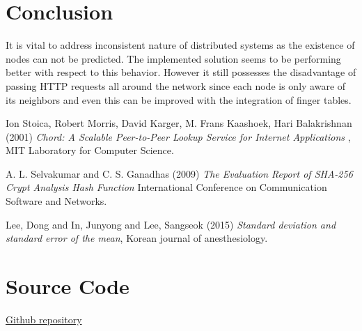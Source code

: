 \documentclass[
    a4paper,
    twocolumn,
]{article}
\begin{document}
\section{Conclusion}

It is vital to address inconsistent nature of distributed systems as the existence of nodes can not be predicted. The implemented solution seems to be performing better with respect to this behavior. However it still possesses the disadvantage of passing HTTP requests all around the network since each node is only aware of its neighbors and even this can be improved with the integration of finger tables. 

\begin{thebibliography}{9}	
	Ion Stoica, Robert Morris, David Karger, M. Frans Kaashoek, Hari Balakrishnan (2001) \emph{Chord: A Scalable Peer-to-Peer Lookup Service for Internet Applications }, MIT Laboratory for Computer Science.
	
	A. L. Selvakumar and C. S. Ganadhas (2009) \emph{The Evaluation Report of SHA-256 Crypt Analysis Hash Function} International Conference on Communication Software and Networks.
	
	Lee, Dong and In, Junyong and Lee, Sangseok (2015) \emph{Standard deviation and standard error of the mean}, Korean journal of anesthesiology.
\end{thebibliography}

\appendix
\section{Source Code}
\href{https://github.com/YasiruR/dht/tree/master}{Github repository}
\end{document}
